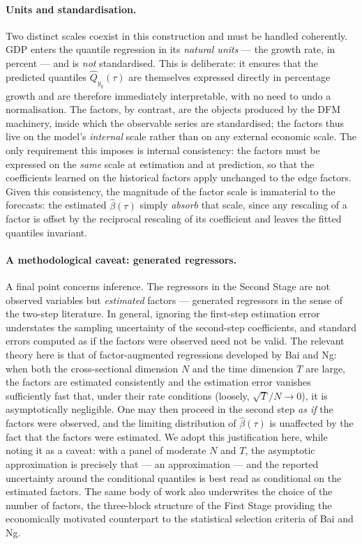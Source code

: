 \documentclass[11pt, a4paper, oneside]{article}
\begin{document}
\paragraph{Units and standardisation.}
Two distinct scales coexist in this construction and must be handled
coherently. GDP enters the quantile regression in its \emph{natural
units} --- the growth rate, in percent --- and is \emph{not}
standardised. This is deliberate: it ensures that the predicted
quantiles $\hat Q_{y_q}(\tau)$ are themselves expressed directly in
percentage growth and are therefore immediately interpretable, with
no need to undo a normalisation. The factors, by contrast, are the
objects produced by the DFM machinery, inside which the observable
series are standardised; the factors thus live on the model's
\emph{internal} scale rather than on any external economic scale. The
only requirement this imposes is internal consistency: the factors
must be expressed on the \emph{same} scale at estimation and at
prediction, so that the coefficients learned on the historical
factors apply unchanged to the edge factors. Given this consistency,
the magnitude of the factor scale is immaterial to the forecasts: the
estimated $\hat\beta(\tau)$ simply \emph{absorb} that scale, since
any rescaling of a factor is offset by the reciprocal rescaling of
its coefficient and leaves the fitted quantiles invariant.

\paragraph{A methodological caveat: generated regressors.}
A final point concerns inference. The regressors in the Second Stage
are not observed variables but \emph{estimated} factors --- generated
regressors in the sense of the two-step literature. In general,
ignoring the first-step estimation error understates the sampling
uncertainty of the second-step coefficients, and standard errors
computed as if the factors were observed need not be valid. The
relevant theory here is that of factor-augmented regressions
developed by Bai and Ng: when both the cross-sectional dimension $N$
and the time dimension $T$ are large, the factors are estimated
consistently and the estimation error vanishes sufficiently fast
that, under their rate conditions (loosely, $\sqrt{T}/N \to 0$), it
is asymptotically negligible. One may then proceed in the second
step \emph{as if} the factors were observed, and the limiting
distribution of $\hat\beta(\tau)$ is unaffected by the fact that the
factors were estimated. We adopt this justification here, while
noting it as a caveat: with a panel of moderate $N$ and $T$, the
asymptotic approximation is precisely that --- an approximation ---
and the reported uncertainty around the conditional quantiles is best
read as conditional on the estimated factors. The same body of work
also underwrites the choice of the number of factors, the three-block
structure of the First Stage providing the economically motivated
counterpart to the statistical selection criteria of Bai and Ng.
\end{document}
